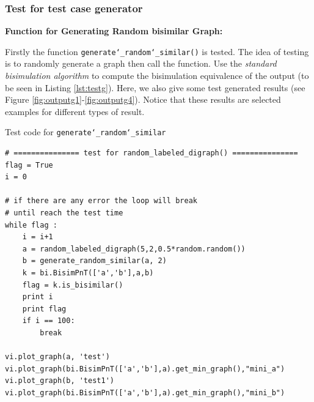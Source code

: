 \subsubsection{Test for test case generator}

\textbf{Function for Generating Random bisimilar Graph:}

\noindent Firstly the function \texttt{generate\char`_random\char`_similar()} is tested.
The idea of testing is to randomly generate a graph then call the function.
Use the \emph{standard bisimulation algorithm} to compute the bisimulation equivalence of the output (to be seen in Listing \ref{lst:testg}).
Here, we also give some test generated results (see Figure \ref{fig:outputg1}-\ref{fig:outputg4}).
Notice that these results are selected examples for different types of result.


\begin{code}
\caption{Test code for \texttt{generate\char`_random\char`_similar}}
\label{lst:testg}
\begin{verbatim}
# =============== test for random_labeled_digraph() ===============
flag = True
i = 0

# if there are any error the loop will break
# until reach the test time
while flag :
    i = i+1
    a = random_labeled_digraph(5,2,0.5*random.random())
    b = generate_random_similar(a, 2)
    k = bi.BisimPnT(['a','b'],a,b)
    flag = k.is_bisimilar()
    print i
    print flag
    if i == 100:
        break

vi.plot_graph(a, 'test')
vi.plot_graph(bi.BisimPnT(['a','b'],a).get_min_graph(),"mini_a")
vi.plot_graph(b, 'test1')
vi.plot_graph(bi.BisimPnT(['a','b'],a).get_min_graph(),"mini_b")
\end{verbatim}
\end{code}


